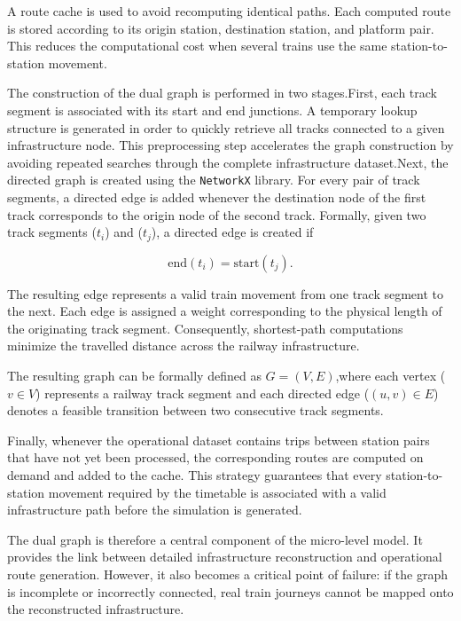 A route cache is used to avoid recomputing identical paths. Each computed route is stored according to its origin station, 
destination station, and platform pair. This reduces the computational cost when several trains use the same 
station-to-station movement.

The construction of the dual graph is performed in two stages.First, each track segment is associated with its start and 
end junctions. A temporary lookup structure is generated in order to quickly retrieve all tracks connected to a given 
infrastructure node. This preprocessing step accelerates the graph construction by avoiding repeated searches through 
the complete infrastructure dataset.Next, the directed graph is created using the \texttt{NetworkX} library. For every 
pair of track segments, a directed edge is added whenever the destination node of the first track corresponds to the 
origin node of the second track. Formally, given two track segments ($t_i$) and ($t_j$), a directed edge is created if

\begin{equation}
    \text{end}(t_i) = \text{start}(t_j).
\end{equation}

The resulting edge represents a valid train movement from one track segment to the next. Each edge is assigned a weight 
corresponding to the physical length of the originating track segment. Consequently, shortest-path computations minimize 
the travelled distance across the railway infrastructure.

The resulting graph can be formally defined as $G=(V,E)$,where each vertex ($v \in V$) represents a railway track segment 
and each directed edge ($(u,v)\in E$) denotes a feasible transition between two consecutive track segments.

Finally, whenever the operational dataset contains trips between station pairs that have not yet been processed, the 
corresponding routes are computed on demand and added to the cache. This strategy guarantees that every station-to-station 
movement required by the timetable is associated with a valid infrastructure path before the simulation is generated.

The dual graph is therefore a central component of the micro-level model. It provides the link between detailed 
infrastructure reconstruction and operational route generation. However, it also becomes a critical point of failure: 
if the graph is incomplete or incorrectly connected, real train journeys cannot be mapped onto the reconstructed 
infrastructure.


